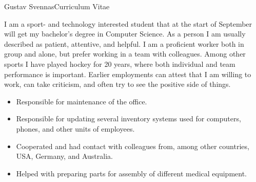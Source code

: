 \documentclass{article}
\begin{document}


\begin{cv}{Gustav Svennas}{Curriculum Vitae}


I am a sport- and technology interested student that at the start of September will get my bachelor's degree in Computer Science. As a person I am usually described as patient, attentive, and helpful. I am a proficient worker both in group and alone, but prefer working in a team with colleagues. Among other sports I have played hockey for 20 years, where both individual and team performance is important. Earlier employments can attest that I am willing to work, can take criticism, and often try to see the positive side of things.  



\begin{cvevent}[2022-07][2022-08]
    \begin{itemize}
        \item Responsible for maintenance of the office.
    \end{itemize}
\end{cvevent}


\begin{cvevent}[2021-03][2021-10]
    \begin{itemize}
        \item Responsible for updating several inventory systems used for computers, phones, and other units of employees. 
        \item Cooperated and had contact with colleagues from, among other countries, USA, Germany, and Australia.
    \end{itemize}
\end{cvevent}


\begin{cvevent}[2015-06][2015-07]
    \begin{itemize}
        \item Helped with preparing parts for assembly of different medical equipment.
    \end{itemize}
\end{cvevent}


\end{cv}
\end{document}
